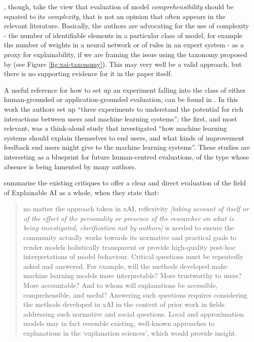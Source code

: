 \citet{guidotti2018survey}, though, take the view that evaluation of model \textit{comprehensibility} should be equated to its \textit{complexity}, that is not an opinion that often appears in the relevant literature.
Basically, the authors are advocating for the use of complexity - the number of identifiable elements in a particular class of model, for example the number of weights in a neural network or of rules in an expert system - as a proxy for explainability, if we are framing the issue using the taxonomy proposed by \citet{doshi2017towards} (see Figure \ref{fig:xai-taxonomy}).
This may very well be a valid approach, but there is no supporting evidence for it in the paper itself.

A useful reference for how to set up an experiment falling into the class of either human-grounded or application-grounded evaluation, can be found in \citet{stumpf2009interacting}.
In this work the authors set up \enquote{three experiments to understand the potential for rich interactions between users and machine learning systems}; the first, and most relevant, was a think-aloud study that investigated \enquote{how machine learning systems should explain themselves to end users, and what kinds of improvement feedback end users might give to the machine learning systems}.
These studies are interesting as a blueprint for future human-centred evaluations, of the type whose absence is being lamented by many authors.

\citet{mittelstadt2019explaining} summarise the existing critiques to offer a clear and direct evaluation of the field of Explainable AI as a whole, when they state that:
\begin{quotation}
	no matter the approach taken in xAI, reflexivity \textit{[taking account of itself or of the effect of the personality or presence of the researcher on what is being investigated, clarification not by authors]} is needed to ensure the community actually works towards its normative and practical goals to render models holistically transparent or provide high-quality post-hoc interpretations of model behaviour. Critical questions must be repeatedly asked and answered. For example, will the methods developed make machine learning models more interpretable? More trustworthy to users? More accountable? And to whom will explanations be accessible, comprehensible, and useful? Answering such questions requires considering the methods developed in xAI in the context of prior work in fields addressing such normative and social questions. Local and approximation models may in fact resemble existing, well-known approaches to explanations in the `explanation sciences', which would provide insight.
	
	\hfill \citet[pag. 3]{mittelstadt2019explaining}
\end{quotation}

